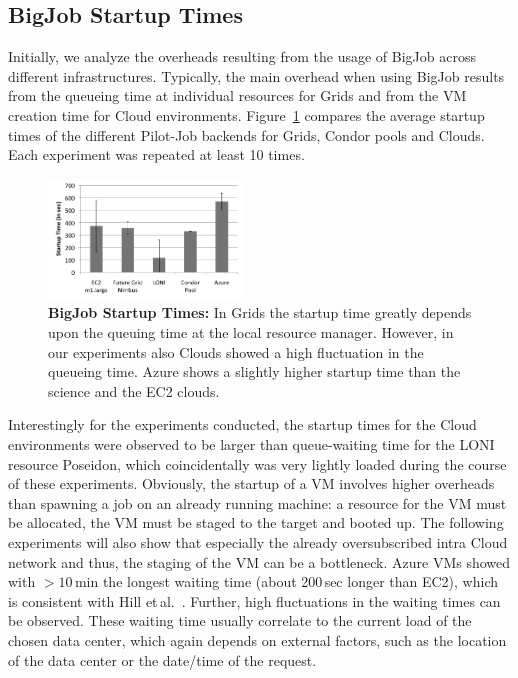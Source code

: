 \documentclass[conference,final]{IEEEtran}
\newcommand{\up}{\vspace*{-1em}}
\begin{document}
\subsection{BigJob Startup Times} 
\up
Initially, we analyze the overheads resulting from the usage of BigJob across
different infrastructures. Typically, the main overhead when using
BigJob results from the queueing time at individual resources for
Grids and from the VM creation time for Cloud environments.
Figure~\ref{fig:performance_setup_time} compares the average startup times of
the different Pilot-Job backends for Grids, Condor pools and Clouds. Each 
experiment was repeated at least 10 times.

\begin{figure}[htbp]
    \centering
        \includegraphics[width=0.46\textwidth]{performance/setup-times}
    \caption{\textbf{BigJob Startup Times:} In Grids the startup time
      greatly depends upon the queuing time at the local resource
      manager. However, in our experiments also Clouds showed a high
      fluctuation in the queueing time. Azure shows a slightly higher
      startup time than the science and the EC2 clouds.\up}
    \label{fig:performance_setup_time}
\end{figure}

Interestingly for the experiments conducted, the startup times for the
Cloud environments were observed to be larger than queue-waiting time
for the LONI resource Poseidon, which coincidentally was very lightly
loaded during the course of these experiments. Obviously, the startup
of a VM involves higher overheads than spawning a job on an already
running machine: a resource for the VM must be allocated, the VM must
be staged to the target and booted up. The following experiments will
also show that especially the already oversubscribed intra Cloud
network and thus, the staging of the VM can be a bottleneck. Azure VMs
showed with $>10$\,min the longest waiting time (about 200\,sec longer than EC2), which
is consistent with Hill et\,al.~\cite{hill10}.  Further,
high fluctuations in the waiting times can be observed. These waiting time
usually correlate to the current load of the chosen data center, which again
depends on external factors, such as the location of the data center or 
the date/time of the request.
\end{document}
